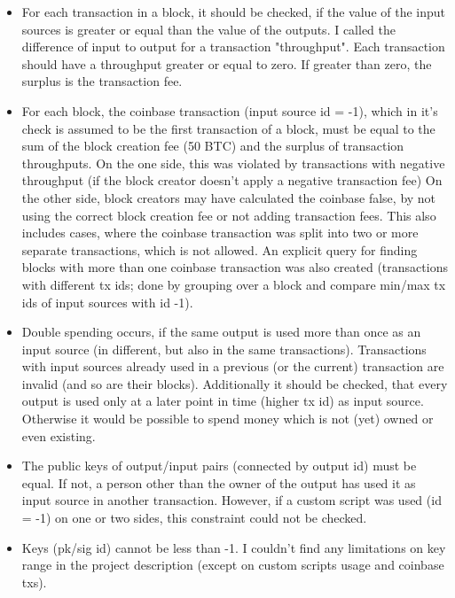 \documentclass[12pt,a4paper]{article}
\begin{document}
\begin{itemize}
\item For each transaction in a block, it should be checked, if the value of the
input sources is greater or equal than the value of the outputs. I called the difference of input to output for a transaction "throughput".
Each transaction should have a throughput greater or equal to zero. If greater than zero, the surplus is the transaction fee.\newline
\item For each block, the coinbase transaction (input source id = -1), which in it's check is assumed to be the first transaction of a block, must be equal to the sum of the block creation fee (50 BTC)
and the surplus of transaction throughputs.\newline
On the one side, this was violated by transactions with negative throughput (if the block creator doesn't apply a negative transaction fee)\newline
On the other side, block creators may have calculated the coinbase false, by not using the correct block creation fee or not adding transaction fees. This also includes cases, where the coinbase transaction was
split into two or more separate transactions, which is not allowed.
An explicit query for finding blocks with more than one coinbase transaction was also created (transactions with different tx ids; done by grouping over a block and compare min/max tx ids of input sources with id -1).\newline
\item Double spending occurs, if the same output is used more than once as an input source (in different, but also in the same transactions). Transactions with input sources already
used in a previous (or the current) transaction are invalid (and so are their blocks).\newline
Additionally it should be checked, that every output is used only at a later point in time (higher tx id) as input source.
Otherwise it would be possible to spend money which is not (yet) owned or even existing.\newline
\item The public keys of output/input pairs (connected by output id) must be equal. If not, a person other than the owner of the output has used it as
input source in another transaction. However, if a custom script was used (id = -1) on one or two sides, this constraint could not be checked.\newline
\item Keys (pk/sig id) cannot be less than -1. I couldn't find any limitations on key range in the project description (except on custom scripts usage and coinbase txs).

\end{itemize}
\end{document}
